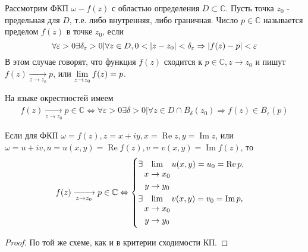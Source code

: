 
\begin{col-answer-preambule}
\end{col-answer-preambule}
Рассмотрим ФКП $\omega - f(z)$ с областью определения $D \subset \mathbb{C}$. Пусть точка $z_0$ -
предельная для $D$, т.е. либо внутренняя, либо граничная. Число $p \in \mathbb{C}$ называется
пределом $f(z)$ в точке $z_0$, если
\begin{equation}
  \label{eq:lecture16-01}
  \forall \varepsilon > 0 \exists \delta_{\varepsilon} > 0 \vert
  \forall z \in D, 0 < \left\lvert z - z_0 \right\rvert < \delta_{\varepsilon} \Rightarrow \left\lvert f(z) - p \right\rvert < \varepsilon
\end{equation}
В этом случае говорят, что функция $f(z)$ сходится к $p \in \mathbb{C}, z \to z_0$ и пишут
$f(z) \xrightarrow[z \to z_0]{} p$, или $\lim\limits_{z \to z_0}f(z) = p$.

На языке окрестностей имеем
\begin{align*}
  f(z) \xrightarrow[z \to z_0]{}p \in \mathbb{C} \Leftrightarrow \forall \varepsilon > 0 \exists
  \delta > 0 \vert \forall z \in D \cap \overline{B_{\delta}}(z_0) \Rightarrow f(z) \in
  \overline{B_{\varepsilon}}(p)
\end{align*}

\begin{theorem}
  Если для ФКП $\omega = f(z), z = x + iy, x = \operatorname{Re}z, y = \operatorname{Im}z$, или
  $\omega = u + iv, u = u(x, y) = \operatorname{Re}f(z), v = v(x, y) = \operatorname{Im}f(z)$, то
  \begin{equation}
    \label{eq:lecture16-02}
    f(z) \xrightarrow[z \to z_0]{}p \in \mathbb{C} \Leftrightarrow
    \begin{cases}
      \exists\lim\limits_{\begin{matrix}
          x \to x_0\\
          y \to y_0
      \end{matrix}}u(x,y) = u_0 = \operatorname{Re}p,\\
      \exists\lim\limits_{\begin{matrix}
          x \to x_0\\
          y \to y_0
      \end{matrix}}v(x,y) = v_0 = \operatorname{Im}p,
    \end{cases}
  \end{equation}
\end{theorem}
\begin{proof}
  По той же схеме, как и в критерии сходимости КП.
\end{proof}

